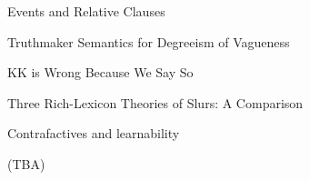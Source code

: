 \documentclass[12pt]{jarticle}
\begin{document}
      {Events and Relative Clauses}
      {}
  
      {Truthmaker Semantics for Degreeism of Vagueness}
      {}




  
      {KK is Wrong Because We Say So}
      {}
  
      {Three Rich-Lexicon Theories of Slurs: A Comparison}
      {}
  
      {Contrafactives and learnability}
      {}




  
      {(TBA)}
      {}






  
\end{document}
